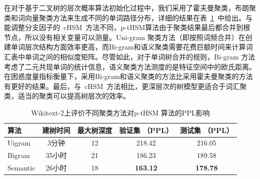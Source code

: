 在对于基于二叉树的层次概率算法初始化过程中，我们采用了霍夫曼聚类，布朗聚类和词向量聚类方法来生成不同的单词路径分布，详细的结果在表~\ref{table:p-thsm}~中给出。与能调整分支因子的~cHSM~方法不同，p-tHSM算法由于聚类结果最后都合并到根节点，所以没有相关变量可以测量。Uni-gram 聚类方法（即按照词频合并）在创建单词层次结构方面效率更高，而Bi-gram和语义聚类需要花费巨额时间来计算词汇表中单词之间的相似度矩阵。尽管如此，对于单词树合并的规则，Bi-gram 方法考虑了二元共现单词的统计信息，语义聚类方法测度的是特征空间中的欧氏距离。在困惑度量指标衡量下，采用Bi-gram和语义聚类的方法比采用霍夫曼聚类的方法有更好的结果。最后，与~cHSM~方法相比，更深层次的树模型更适合于词汇聚类，适当的聚类可以提高树层次的效率。
\begin{table}[!ht]
  \centering
   \caption{Wikitext-2上评价不同聚类方法对p-tHSM 算法的PPL影响\label{table:p-thsm}}
  \begin{tabular}{lcccc} \toprule
  算法  &建树时间&最大树深度 &验证集 （PPL） & 测试集 （PPL）  \\ \midrule
  Uigram  &3分钟&12 &218.42& 216.05     \\
  Bigram  &35小时&21& 186.23& 189.58\\
  Semantic &26小时 &18& \textbf{163.12} & \textbf{178.78}\\
\bottomrule
  \end{tabular}
\end{table}

